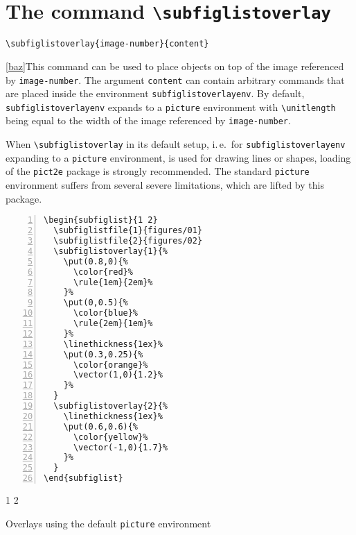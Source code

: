 \documentclass[version=3.12,american]{scrartcl}
\begin{document}
\section{The command \texttt{\textbackslash subfiglistoverlay}}

\begin{verbatim}
\subfiglistoverlay{image-number}{content}
\end{verbatim}

\ref{baz}This command can be used to place objects on top of the image referenced by \texttt{image-number}. The argument \texttt{content} can contain arbitrary commands that are placed inside the environment \texttt{subfiglistoverlayenv}. By default, \texttt{subfiglistoverlayenv} expands to a \texttt{picture} environment with \verb|\unitlength| being equal to the width of the image referenced by \texttt{image-number}.

When \verb|\subfiglistoverlay| in its default setup, i.\,e.\ for \texttt{subfiglistoverlayenv} expanding to a \texttt{picture} environment, is used for drawing lines or shapes, loading of the \texttt{pict2e} package is strongly recommended. The standard \texttt{picture} environment suffers from several severe limitations, which are lifted by this package.

\begin{listing}
\begin{minipage}{0.4\textwidth}
\begin{Verbatim}[numbers=left]
\begin{subfiglist}{1 2}
  \subfiglistfile{1}{figures/01}
  \subfiglistfile{2}{figures/02}
  \subfiglistoverlay{1}{%
    \put(0.8,0){%
      \color{red}%
      \rule{1em}{2em}%
    }%
    \put(0,0.5){%
      \color{blue}%
      \rule{2em}{1em}%
    }%
    \linethickness{1ex}%
    \put(0.3,0.25){%
      \color{orange}%
      \vector(1,0){1.2}%
    }%
  }
  \subfiglistoverlay{2}{%
    \linethickness{1ex}%
    \put(0.6,0.6){%
      \color{yellow}%
      \vector(-1,0){1.7}%
    }%
  }
\end{subfiglist}
\end{Verbatim}
\end{minipage}
\hfill
\begin{minipage}{0.5\textwidth}
\begin{subfiglist}{1 2}
\end{subfiglist}
\end{minipage}
\caption{Overlays using the default \texttt{picture} environment}
\label{lst:overlay-picture}
\end{listing}
\end{document}
